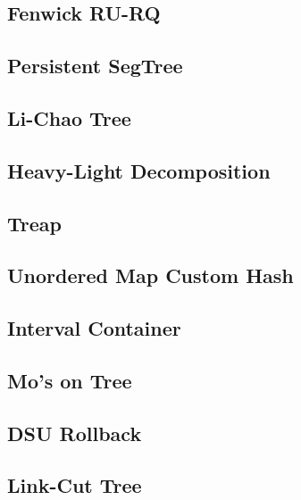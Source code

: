 \subsection{Fenwick RU-RQ}

\subsection{Persistent SegTree}

\subsection{Li-Chao Tree}

\subsection{Heavy-Light Decomposition}

\subsection{Treap}

\subsection{Unordered Map Custom Hash}

\subsection{Interval Container}

\subsection{Mo's on Tree}

\subsection{DSU Rollback}

\subsection{Link-Cut Tree}

